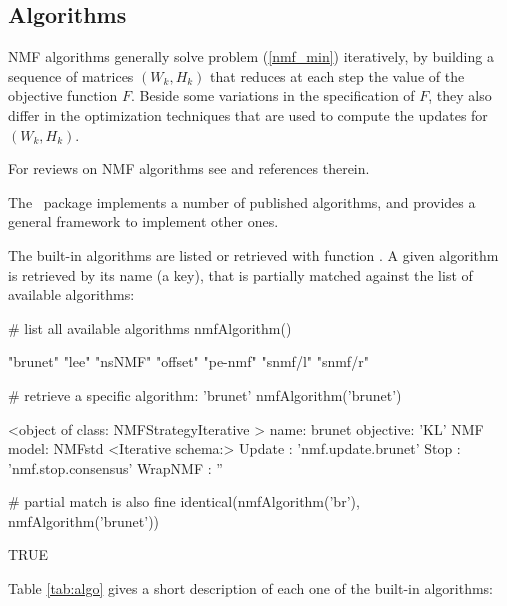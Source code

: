 \documentclass[a4paper]{article}
\newcommand{\nmfpack}{\code{NMF}\ }
\newcommand{\refeqn}[1]{(\ref{#1})}
\begin{document}
\subsection{Algorithms}
NMF algorithms generally solve problem \refeqn{nmf_min} iteratively, by building a sequence 
of matrices $(W_k,H_k)$ that reduces at each step the value of the objective 
function $F$.
Beside some variations in the specification of $F$, they also differ in the 
optimization techniques that are used to compute the updates for $(W_k,H_k)$.

For reviews on NMF algorithms see \cite{Berry06, Chu2004} and references therein.

The \nmfpack package implements a number of published algorithms, and provides a 
general framework to implement other ones.

The built-in algorithms are listed or retrieved with function . 
A given algorithm is retrieved by its name (a  key), that is 
partially matched against the list of available algorithms:

\begin{Schunk}
\begin{Sinput}
 # list all available algorithms
 nmfAlgorithm()
\end{Sinput}
\begin{Soutput}
[1] "brunet" "lee"    "nsNMF"  "offset" "pe-nmf" "snmf/l" "snmf/r"
\end{Soutput}
\begin{Sinput}
 # retrieve a specific algorithm: 'brunet' 
 nmfAlgorithm('brunet')
\end{Sinput}
\begin{Soutput}
<object of class:  NMFStrategyIterative >
name:	 brunet 
objective:	 'KL' 
NMF model:	 NMFstd 
<Iterative schema:>
Update :  'nmf.update.brunet' 
Stop :  'nmf.stop.consensus' 
WrapNMF :  '' 
\end{Soutput}
\begin{Sinput}
 # partial match is also fine
 identical(nmfAlgorithm('br'), nmfAlgorithm('brunet')) 
\end{Sinput}
\begin{Soutput}
[1] TRUE
\end{Soutput}
\end{Schunk}

Table \ref{tab:algo} gives a short description of each one of the built-in algorithms:
\end{document}

